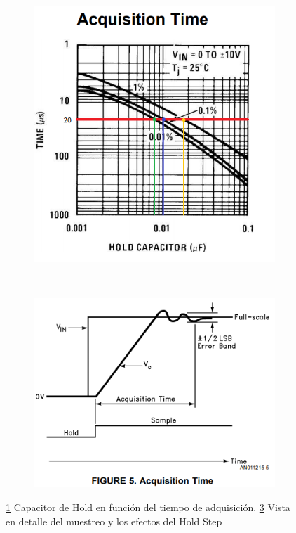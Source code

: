 \begin{figure}[H]
	\begin{subfigure}[b]{0.4\linewidth}
		\centering
		\includegraphics[scale=0.6]{ImagenesEjercicio4/HoldCapAcqTimeSl.png}
		\caption{}
		\label{fig:holdcapacqtimeSL}
	\end{subfigure}
	~
	\begin{subfigure}[b]{0.4\linewidth}
		\centering
		\includegraphics[]{ImagenesEjercicio4/AcqTime.PNG}
		\caption{}
		\label{fig:acqtime}
	\end{subfigure}
 \caption{\ref{fig:holdcapacqtimeSL} Capacitor de Hold en función del tiempo de adquisición. \ref{fig:acqtime} Vista en detalle del muestreo y los efectos del Hold Step}
\end{figure}



